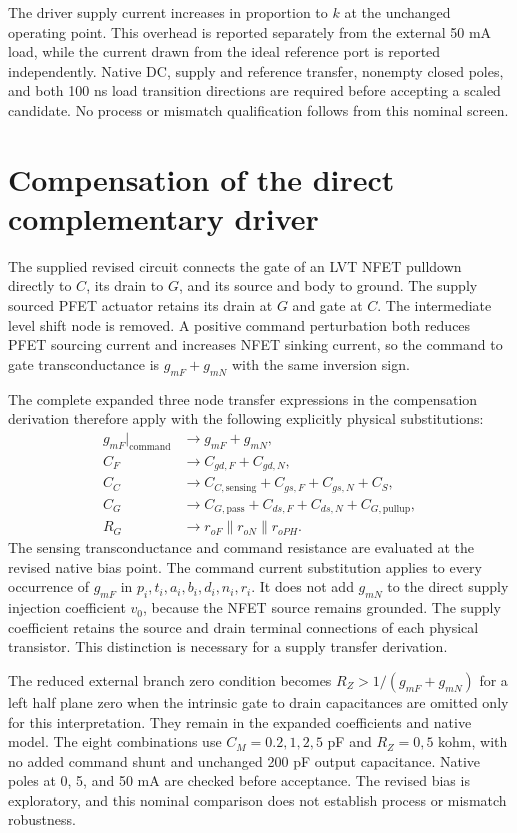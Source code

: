 The driver supply current increases in proportion to $k$ at the unchanged operating point. This overhead is reported separately from the external 50 mA load, while the current drawn from the ideal reference port is reported independently. Native DC, supply and reference transfer, nonempty closed poles, and both 100 ns load transition directions are required before accepting a scaled candidate. No process or mismatch qualification follows from this nominal screen.


\section{Compensation of the direct complementary driver}
The supplied revised circuit connects the gate of an LVT NFET pulldown directly to $C$, its drain to $G$, and its source and body to ground. The supply sourced PFET actuator retains its drain at $G$ and gate at $C$. The intermediate level shift node is removed. A positive command perturbation both reduces PFET sourcing current and increases NFET sinking current, so the command to gate transconductance is $g_{mF}+g_{mN}$ with the same inversion sign.

The complete expanded three node transfer expressions in the compensation derivation therefore apply with the following explicitly physical substitutions:
\begin{align}
 g_{mF}\big|_{\mathrm{command}}&\longrightarrow g_{mF}+g_{mN},\\
 C_F&\longrightarrow C_{gd,F}+C_{gd,N},\\
 C_C&\longrightarrow C_{C,\mathrm{sensing}}+C_{gs,F}+C_{gs,N}+C_S,\\
 C_G&\longrightarrow C_{G,\mathrm{pass}}+C_{ds,F}+C_{ds,N}+C_{G,\mathrm{pullup}},\\
 R_G&\longrightarrow r_{oF}\parallel r_{oN}\parallel r_{oPH}.
\end{align}
The sensing transconductance and command resistance are evaluated at the revised native bias point. The command current substitution applies to every occurrence of $g_{mF}$ in $p_i,t_i,a_i,b_i,d_i,n_i,r_i$. It does not add $g_{mN}$ to the direct supply injection coefficient $v_0$, because the NFET source remains grounded. The supply coefficient retains the source and drain terminal connections of each physical transistor. This distinction is necessary for a supply transfer derivation.

The reduced external branch zero condition becomes $R_Z>1/(g_{mF}+g_{mN})$ for a left half plane zero when the intrinsic gate to drain capacitances are omitted only for this interpretation. They remain in the expanded coefficients and native model. The eight combinations use $C_M=0.2,1,2,5$ pF and $R_Z=0,5$ kohm, with no added command shunt and unchanged 200 pF output capacitance. Native poles at 0, 5, and 50 mA are checked before acceptance. The revised bias is exploratory, and this nominal comparison does not establish process or mismatch robustness.


